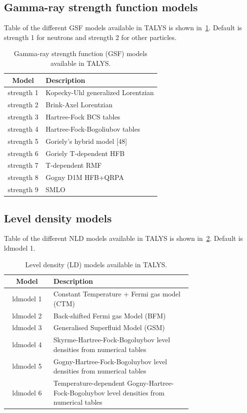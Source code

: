\documentclass[english, notitlepage]{article}
\begin{document}
\subsection{Gamma-ray strength function models}
Table of the different GSF models available in TALYS is shown in~\cref{tab:gsf_models}. Default is strength 1 for neutrons and strength 2 for other particles. 
\begin{table}[h!]
\centering
\begin{tabular}{|c|p{0.75\linewidth}|}
\hline
Model & Description \\\hline
strength 1 & Kopecky-Uhl generalized Lorentzian \\\hline
strength 2 & Brink-Axel Lorentzian \\\hline
strength 3 & Hartree-Fock BCS tables \\\hline
strength 4 & Hartree-Fock-Bogoliubov tables \\\hline
strength 5 & Goriely’s hybrid model [48] \\\hline
strength 6 & Goriely T-dependent HFB \\\hline
strength 7 & T-dependent RMF \\\hline
strength 8 & Gogny D1M HFB+QRPA \\\hline
strength 9 & SMLO \\\hline
\end{tabular}
\caption{Gamma-ray strength function (GSF) models available in TALYS.}
\label{tab:gsf_models}
\end{table}

\subsection{Level density models}
Table of the different NLD models available in TALYS is shown in~\cref{tab:ld_models}. Default is ldmodel 1. 
\begin{table}[h!]
\centering
\begin{tabular}{|c|p{0.75\linewidth}|}
\hline
Model & Description \\\hline
ldmodel 1 & Constant Temperature + Fermi gas model (CTM) \\\hline
ldmodel 2 & Back-shifted Fermi gas Model (BFM) \\\hline
ldmodel 3 & Generalised Superfluid Model (GSM) \\\hline
ldmodel 4 & Skyrme-Hartree-Fock-Bogoluybov level densities from numerical tables \\\hline
ldmodel 5 & Gogny-Hartree-Fock-Bogoluybov level densities from numerical tables \\\hline
ldmodel 6 & Temperature-dependent Gogny-Hartree-Fock-Bogoluybov level densities from numerical tables \\\hline
\end{tabular}
\caption{Level density (LD) models available in TALYS.}
\label{tab:ld_models}
\end{table}
\end{document}
